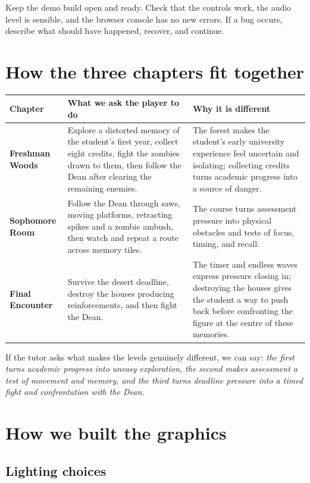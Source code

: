 \documentclass[11pt,a4paper]{article}
\begin{document}
Keep the demo build open and ready. Check that the controls work, the audio level is sensible, and the browser console has no new errors. If a bug occurs, describe what should have happened, recover, and continue.

\section{How the three chapters fit together}

\begin{tabularx}{\textwidth}{>{\bfseries}p{} X X}
  \toprule
  Chapter & What we ask the player to do & Why it is different \\
  \midrule
  Freshman Woods & Explore a distorted memory of the student's first year, collect eight credits, fight the zombies drawn to them, then follow the Dean after clearing the remaining enemies. & The forest makes the student's early university experience feel uncertain and isolating; collecting credits turns academic progress into a source of danger. \\
  Sophomore Room & Follow the Dean through saws, moving platforms, retracting spikes and a zombie ambush, then watch and repeat a route across memory tiles. & The course turns assessment pressure into physical obstacles and tests of focus, timing, and recall. \\
  Final Encounter & Survive the desert deadline, destroy the houses producing reinforcements, and then fight the Dean. & The timer and endless waves express pressure closing in; destroying the houses gives the student a way to push back before confronting the figure at the centre of these memories. \\
  \bottomrule
\end{tabularx}

If the tutor asks what makes the levels genuinely different, we can say: \emph{the first turns academic progress into uneasy exploration, the second makes assessment a test of movement and memory, and the third turns deadline pressure into a timed fight and confrontation with the Dean.}

\section{How we built the graphics}

\subsection{Lighting choices}
\end{document}
